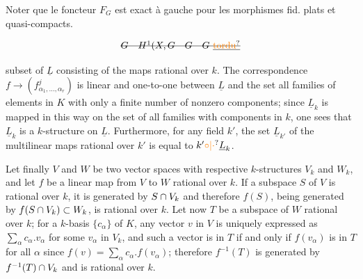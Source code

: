 
Noter que le foncteur $F_G$
est  exact à gauche
pour les morphismes fid. plats
et quasi-compacts.

\[
\deleted{G\quad H^1(X,G\quad G\quad G\ \underline{\unsure{\text{tordu}}}}
\]

subset of $\underline L$ consisting of the maps rational over $k$. The correspondence
$f\longrightarrow(f^{j}_{\alpha_1,\ldots,\alpha_r})$ is linear and one-to-one between $\underline L$ and the set all families of
elements in $K$ with only a finite number of nonzero components; since $\underline L_k$ is
mapped in this way on the set of all families with components in $k$, one sees that
$\underline L_k$ is a $k$-structure on $\underline L$. Furthermore, for any field $k'$, the set $\underline L_{k'}$ of the
multilinear maps rational over $k'$ is equal to $k'\unsure{\circ|\cdot}\underline L_k$.

Let finally $V$ and $W$ be two vector spaces with respective $k$-structures
$V_k$ and $W_k$, and let $f$ be a linear map from $V$ to $W$ rational over $k$. If a subspace $S$ of $V$ is rational over $k$, it is generated by $S\cap V_k$ and therefore $f(S)$,
being generated by $f(S\cap V_k)\subset W_k$, is rational over $k$. Let now $T$ be a subspace
of $W$ rational over $k$; for a $k$-basis $\{c_\alpha\}$ of $K$, any vector $v$ in $V$ is uniquely expressed as $\sum_\alpha c_\alpha.v_\alpha$ for some $v_\alpha$ in $V_k$, and such a vector is in $T$ if and only if
$f(v_\alpha)$ is in $T$ for all $\alpha$ since $f(v)=\sum_\alpha c_\alpha.f(v_\alpha)$; therefore $f^{-1}(T)$ is generated by
$f^{-1}(T)\cap V_k$ and is rational over $k$.

